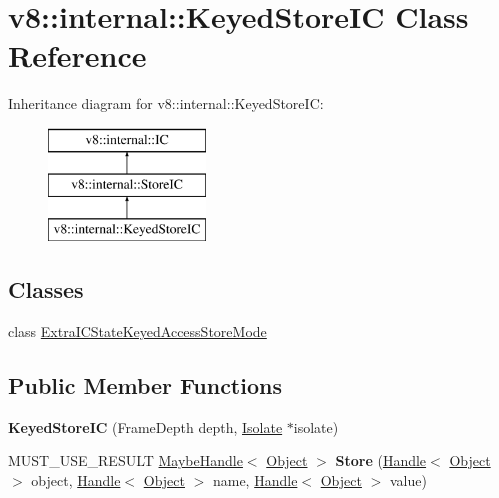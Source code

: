 \hypertarget{classv8_1_1internal_1_1_keyed_store_i_c}{}\section{v8\+:\+:internal\+:\+:Keyed\+Store\+I\+C Class Reference}
\label{classv8_1_1internal_1_1_keyed_store_i_c}
Inheritance diagram for v8\+:\+:internal\+:\+:Keyed\+Store\+I\+C\+:\begin{figure}[H]
\begin{center}
\leavevmode
\includegraphics[height=3.000000cm]{classv8_1_1internal_1_1_keyed_store_i_c}
\end{center}
\end{figure}
\subsection*{Classes}
\begin{DoxyCompactItemize}
\item 
class \hyperlink{classv8_1_1internal_1_1_keyed_store_i_c_1_1_extra_i_c_state_keyed_access_store_mode}{Extra\+I\+C\+State\+Keyed\+Access\+Store\+Mode}
\end{DoxyCompactItemize}
\subsection*{Public Member Functions}
\begin{DoxyCompactItemize}
\item 
\hypertarget{classv8_1_1internal_1_1_keyed_store_i_c_a71e31e575c624a2e309b5a26d4793a41}{}{\bfseries Keyed\+Store\+I\+C} (Frame\+Depth depth, \hyperlink{classv8_1_1internal_1_1_isolate}{Isolate} $\ast$isolate)\label{classv8_1_1internal_1_1_keyed_store_i_c_a71e31e575c624a2e309b5a26d4793a41}

\item 
\hypertarget{classv8_1_1internal_1_1_keyed_store_i_c_a10e43cfebb31810bfba3ff4ae22e0225}{}M\+U\+S\+T\+\_\+\+U\+S\+E\+\_\+\+R\+E\+S\+U\+L\+T \hyperlink{classv8_1_1internal_1_1_maybe_handle}{Maybe\+Handle}$<$ \hyperlink{classv8_1_1internal_1_1_object}{Object} $>$ {\bfseries Store} (\hyperlink{classv8_1_1internal_1_1_handle}{Handle}$<$ \hyperlink{classv8_1_1internal_1_1_object}{Object} $>$ object, \hyperlink{classv8_1_1internal_1_1_handle}{Handle}$<$ \hyperlink{classv8_1_1internal_1_1_object}{Object} $>$ name, \hyperlink{classv8_1_1internal_1_1_handle}{Handle}$<$ \hyperlink{classv8_1_1internal_1_1_object}{Object} $>$ value)\label{classv8_1_1internal_1_1_keyed_store_i_c_a10e43cfebb31810bfba3ff4ae22e0225}

\end{DoxyCompactItemize}
